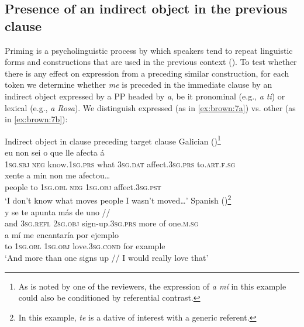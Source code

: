 \documentclass[output=paper]{langscibook}
\begin{document}
\subsection{Presence of an indirect object in the previous clause}
Priming is a psycholinguistic process by which speakers tend to repeat linguistic forms and constructions that are used in the previous context (\citealt{CameronFlores-Ferrán2004, Travis2007, Abreu2012, TravisTorresCacoullos2012}). To test whether there is any effect on expression from a preceding similar construction, for each token we determine whether \textit{me} is preceded in the immediate clause by an indirect object expressed by a PP headed by \textit{a}, be it pronominal (e.g., \textit{a ti}) or lexical (e.g., \textit{a Rosa}). We distinguish expressed (as in \ref{ex:brown:7a}) vs. other (as in \ref{ex:brown:7b}):\pagebreak



\ea%
    Indirect object in clause preceding target clause\label{ex:brown:7}
    \ea  Galician ()\footnote{As is noted by one of the reviewers, the expression of \textit{a mí} in this example could also be conditioned by referential contrast.}\label{ex:brown:7a}\\
    \gll eu non sei {o que} lle afecta á \\ 
         \textsc{1sg.sbj} \textsc{neg} know.\textsc{1sg.prs} what \textsc{3sg.dat} affect.\textsc{3sg.prs} to.\textsc{art.f.sg} \\
     \gll xente {\textbar} a min non me afectou…\\     
         people {} to \textsc{1sg.obl} \textsc{neg} \textsc{1sg.obj} affect.\textsc{3sg.pst}\\
    \glt ‘I don’t know what moves people {\textbar} I wasn’t moved…’
    \ex  Spanish ()\footnote{In this example, \textit{te} is a dative of interest with a generic referent.} \label{ex:brown:7b}\\
    \gll y se te apunta más de uno // \\ 
         and \textsc{3sg.refl} \textsc{2sg.obj} sign-up.\textsc{3sg.prs} more of one.\textsc{m.sg} \\
    \gll a mí me encantaría por ejemplo\\     
         to \textsc{1sg.obl} \textsc{1sg.obj} love.\textsc{3sg.cond} for example\\
    \glt ‘And more than one signs up // I would really love that’
    \z
\z
\end{document}
